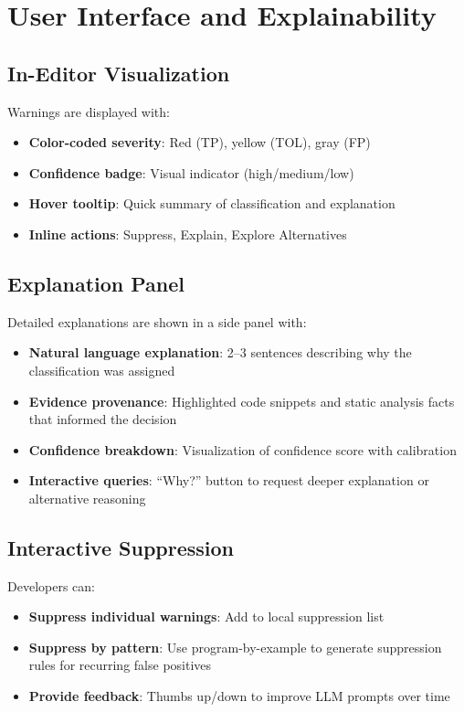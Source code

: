 \documentclass[conference]{IEEEtran}
\begin{document}
\section{User Interface and Explainability}

\subsection{In-Editor Visualization}

Warnings are displayed with:
\begin{itemize}
\item \textbf{Color-coded severity}: Red (TP), yellow (TOL), gray (FP)
\item \textbf{Confidence badge}: Visual indicator (high/medium/low)
\item \textbf{Hover tooltip}: Quick summary of classification and explanation
\item \textbf{Inline actions}: Suppress, Explain, Explore Alternatives
\end{itemize}

\subsection{Explanation Panel}

Detailed explanations are shown in a side panel with:
\begin{itemize}
\item \textbf{Natural language explanation}: 2--3 sentences describing why the classification was assigned
\item \textbf{Evidence provenance}: Highlighted code snippets and static analysis facts that informed the decision
\item \textbf{Confidence breakdown}: Visualization of confidence score with calibration
\item \textbf{Interactive queries}: ``Why?'' button to request deeper explanation or alternative reasoning
\end{itemize}

\subsection{Interactive Suppression}

Developers can:
\begin{itemize}
\item \textbf{Suppress individual warnings}: Add to local suppression list
\item \textbf{Suppress by pattern}: Use program-by-example to generate suppression rules for recurring false positives
\item \textbf{Provide feedback}: Thumbs up/down to improve LLM prompts over time
\end{itemize}
\end{document}
